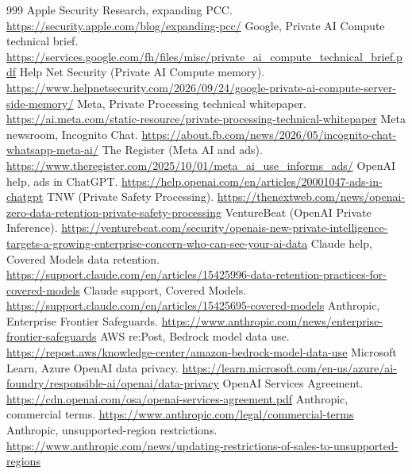 \documentclass[10pt,a4paper]{article}
\begin{document}
\begin{thebibliography}{999}
 Apple Security Research, expanding PCC. \url{https://security.apple.com/blog/expanding-pcc/}
 Google, Private AI Compute technical brief. \url{https://services.google.com/fh/files/misc/private_ai_compute_technical_brief.pdf}
 Help Net Security (Private AI Compute memory). \url{https://www.helpnetsecurity.com/2026/09/24/google-private-ai-compute-server-side-memory/}
 Meta, Private Processing technical whitepaper. \url{https://ai.meta.com/static-resource/private-processing-technical-whitepaper}
 Meta newsroom, Incognito Chat. \url{https://about.fb.com/news/2026/05/incognito-chat-whatsapp-meta-ai/}
 The Register (Meta AI and ads). \url{https://www.theregister.com/2025/10/01/meta_ai_use_informs_ads/}
 OpenAI help, ads in ChatGPT. \url{https://help.openai.com/en/articles/20001047-ads-in-chatgpt}
 TNW (Private Safety Processing). \url{https://thenextweb.com/news/openai-zero-data-retention-private-safety-processing}
 VentureBeat (OpenAI Private Inference). \url{https://venturebeat.com/security/openais-new-private-intelligence-targets-a-growing-enterprise-concern-who-can-see-your-ai-data}
 Claude help, Covered Models data retention. \url{https://support.claude.com/en/articles/15425996-data-retention-practices-for-covered-models}
 Claude support, Covered Models. \url{https://support.claude.com/en/articles/15425695-covered-models}
 Anthropic, Enterprise Frontier Safeguards. \url{https://www.anthropic.com/news/enterprise-frontier-safeguards}
 AWS re:Post, Bedrock model data use. \url{https://repost.aws/knowledge-center/amazon-bedrock-model-data-use}
 Microsoft Learn, Azure OpenAI data privacy. \url{https://learn.microsoft.com/en-us/azure/ai-foundry/responsible-ai/openai/data-privacy}
 OpenAI Services Agreement. \url{https://cdn.openai.com/osa/openai-services-agreement.pdf}
 Anthropic, commercial terms. \url{https://www.anthropic.com/legal/commercial-terms}
 Anthropic, unsupported-region restrictions. \url{https://www.anthropic.com/news/updating-restrictions-of-sales-to-unsupported-regions}

\end{thebibliography}
\end{document}
